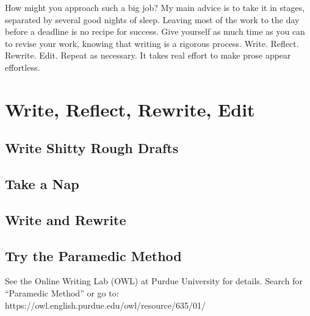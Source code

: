 \documentclass[11pt,twocolumn]{article}
\begin{document}
How might you approach such a big job? My main advice is to take it in
stages, separated by several good nights of sleep. Leaving most of the
work to the day before a deadline is no recipe for success. Give
yourself as much time as you can to revise your work, knowing that
writing is a rigorous process. Write. Reflect. Rewrite. Edit. Repeat as
necessary. It takes real effort to make prose appear effortless.

\section{Write, Reflect, Rewrite, Edit}

\subsection{Write Shitty Rough Drafts}

\subsection{Take a Nap}

\subsection{Write and Rewrite}

\subsection{Try the Paramedic Method}

See the Online Writing Lab (OWL) at Purdue University for details.
Search for “Paramedic Method” or go to:
https://owl.english.purdue.edu/owl/resource/635/01/
\end{document}
